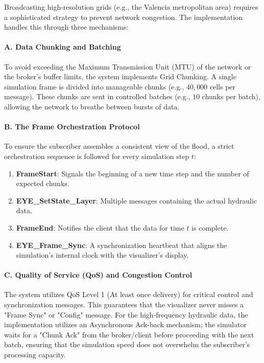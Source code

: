 Broadcasting high-resolution grids (e.g., the Valencia metropolitan area) requires a sophisticated strategy to prevent network 
congestion. The implementation handles this through three mechanisms:

\paragraph{A. Data Chunking and Batching}

To avoid exceeding the Maximum Transmission Unit (MTU) of the network or the broker’s buffer limits, the system implements Grid 
Chunking. A single simulation frame is divided into manageable chunks (e.g., $40,000$ cells per message). These chunks are sent in 
controlled batches (e.g., $10$ chunks per batch), allowing the network to breathe between bursts of data.

\paragraph{B. The Frame Orchestration Protocol}

To ensure the subscriber assembles a consistent view of the flood, a strict orchestration sequence is followed for every simulation 
step $t$:

\begin{enumerate}
    \item \textbf{FrameStart}: Signals the beginning of a new time step and the number of expected chunks.

    \item \textbf{EYE\_SetState\_Layer}: Multiple messages containing the actual hydraulic data.

    \item \textbf{FrameEnd}: Notifies the client that the data for time $t$ is complete.

    \item \textbf{EYE\_Frame\_Sync}: A synchronization heartbeat that aligns the simulation's internal clock with the visualizer's display.
\end{enumerate}

\paragraph{C. Quality of Service (QoS) and Congestion Control}

The system utilizes QoS Level 1 (At least once delivery) for critical control and synchronization messages. This guarantees that the 
visualizer never misses a "Frame Sync" or "Config" message. For the high-frequency hydraulic data, the implementation utilizes an 
Asynchronous Ack-back mechanism; the simulator waits for a "Chunk Ack" from the broker/client before proceeding with the next batch, 
ensuring that the simulation speed does not overwhelm the subscriber's processing capacity.


